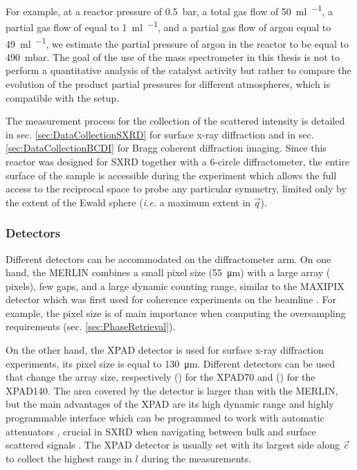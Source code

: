 For example, at a reactor pressure of \qty{0.5}{\bar}, a total gas flow of \qty{50}{\ml\per\min}, a partial gas flow of  equal to \qty{1}{\ml\per\min}, and a partial gas flow of argon equal to \qty{49}{\ml\per\min}, we estimate the partial pressure of argon in the reactor to be equal to \qty{490}{\milli\bar}.
The goal of the use of the mass spectrometer in this thesis is not to perform a quantitative analysis of the catalyst activity but rather to compare the evolution of the product partial pressures for different atmospheres, which is compatible with the setup.

The measurement process for the collection of the scattered intensity is detailed in sec. \ref{sec:DataCollectionSXRD} for surface x-ray diffraction and in sec. \ref{sec:DataCollectionBCDI} for Bragg coherent diffraction imaging.
Since this reactor was designed for SXRD together with a 6-circle diffractometer, the entire surface of the sample is accessible during the experiment which allows the full access to the reciprocal space to probe any particular symmetry, limited only by the extent of the Ewald sphere (\textit{i.e.} a maximum extent in $\vec{q}$).

\subsubsection{Detectors}

Different detectors can be accommodated on the diffractometer arm.
On one hand, the MERLIN \parencite{Bewley2006} combines a small pixel size (\qty{55}{\um}) with a large array ( pixels), few gaps, and a large dynamic counting range, similar to the MAXIPIX detector \parencite{Ponchut2011} which was first used for coherence experiments on the beamline \parencite{Schavkan2013, Li2020}.
For example, the pixel size is of main importance when computing the oversampling requirements (sec. \ref{sec:PhaseRetrieval}).

On the other hand, the XPAD detector \parencite{Basolo2005, Dawiec2016} is used for surface x-ray diffraction experiments, its pixel size is equal to \qty{130}{\um}.
Different detectors can be used that change the array size, respectively () for the XPAD70 and () for the XPAD140.
The area covered by the detector is larger than with the MERLIN, but the main advantages of the XPAD are its high dynamic range and highly programmable interface \parencite{Fertey2013} which can be programmed to work with automatic attenuators \parencite{Dawiec2016}, crucial in SXRD when navigating between bulk and surface scattered signals .
The XPAD detector is usually set with its largest side along $\vec{c}$ to collect the highest range in $l$ during the measurements.